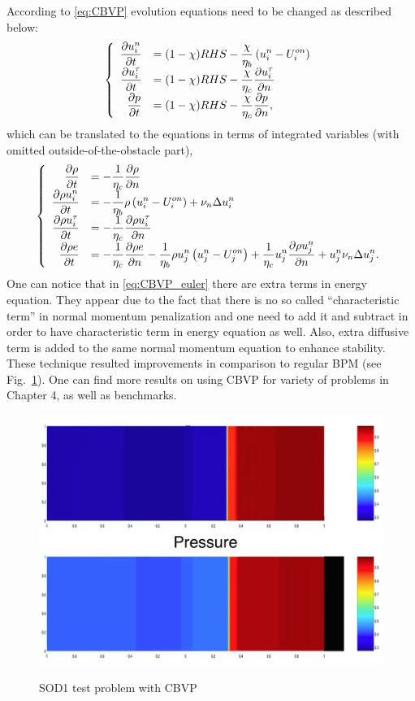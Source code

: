 According to \eqref{eq:CBVP} evolution equations need to be changed as described below:
\begin{align*}
\left\{\begin{array}{rl}
\displaystyle \frac {\partial u_i^n }{\partial t} & = \displaystyle (1-\chi)RHS - \frac \chi {\eta_b} \left(u_i^n - U_i^{on}\right) \\
\displaystyle \frac {\partial u_i^\tau}{\partial t} & = \displaystyle (1-\chi) RHS - \frac \chi {\eta_c} \frac {\partial u_i^\tau}{\partial n} \\
\displaystyle \frac {\partial p}{\partial t} & = \displaystyle (1-\chi) RHS - \frac \chi {\eta_c} \frac {\partial p}{\partial n},
\end{array}\right.
\end{align*}
which can be translated to the equations in terms of integrated variables (with omitted outside-of-the-obstacle part),
\begin{align}
\left\{\begin{array}{rl}
\displaystyle \frac {\partial \rho}{\partial t} & = \displaystyle -\frac 1 {\eta_c} \frac {\partial \rho}{\partial n} \\ [1ex]
\displaystyle \frac {\partial \rho u_i^n}{\partial t} & = \displaystyle -\frac 1{\eta_b} \rho \left(u_i^n - U_i^{on}\right) + \nu_n \Delta u_i^n \\ [1ex]
\displaystyle \frac {\partial \rho u_i^\tau}{\partial t} & = \displaystyle -\frac 1{\eta_c} \frac {\partial \rho u_i^\tau}{\partial n} \\ [1ex]
\displaystyle \frac {\partial \rho e}{\partial t} & = \displaystyle -\frac 1{\eta_c} \frac {\partial \rho e}{\partial n} - \frac 1{\eta_b}\rho u_j^n \left(u_j^n - U_j^{on}\right) + \frac 1{\eta_c} u_j^n \frac {\partial \rho u_j^n}{\partial n} + u_j^n \nu_n \Delta u_j^n.
\end{array}\right. \label{eq:CBVP_euler}
\end{align}
One can notice that in \eqref{eq:CBVP_euler} there are extra terms in energy equation. They appear due to the fact that there is no so called ``characteristic term'' in normal momentum penalization and one need to add it and subtract in order to have characteristic term in energy equation as well. Also, extra diffusive term is added to the same normal momentum equation to enhance stability. These technique resulted improvements in comparison to regular BPM (see Fig.~\ref{fig:sod_cbvp}). One can find more results on using CBVP for variety of problems in Chapter 4, as well as benchmarks.
\begin{figure}[h!]
\centering \includegraphics[scale=0.3]{fig/sod1_cbvp.png}\\
\caption{SOD1 test problem with CBVP \label{fig:sod_cbvp}}
\end{figure}







